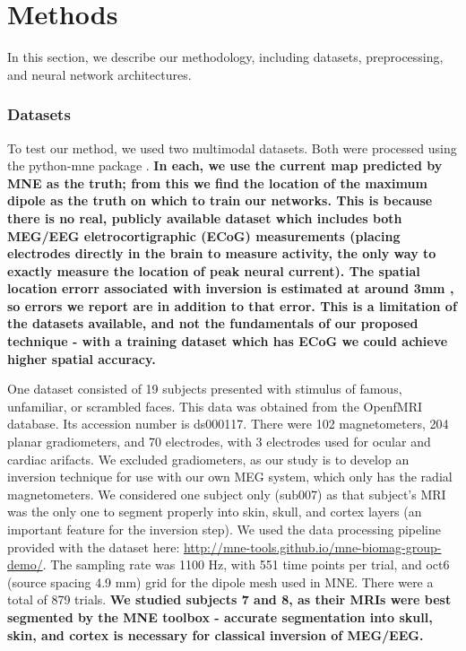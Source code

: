 \documentclass[journal,12pt,onecolumn,draftclsnofoot,]{IEEEtran}
\begin{document}
\section{Methods}

In this section, we describe our methodology, including datasets, preprocessing, and neural network architectures.

\subsubsection{Datasets}

To test our method, we used two multimodal datasets. Both were processed using the python-mne package \cite{gramfort2014mne}. \textbf{In each, we use the current map predicted by MNE as the truth; from this we find the location of the maximum dipole as the truth on which to train our networks. This is because there is no real, publicly available dataset which includes both MEG/EEG eletrocortigraphic (ECoG) measurements (placing electrodes directly in the brain to measure activity, the only way to exactly measure the location of peak neural current). The spatial location errorr associated with inversion is estimated at around 3mm \cite{leahy1998study}, so errors we report are in addition to that error. This is a limitation of the datasets available, and not the fundamentals of our proposed technique - with a training dataset which has ECoG we could achieve higher spatial accuracy.}

One dataset \cite{wakeman2015multi} consisted of 19 subjects presented with stimulus of famous, unfamiliar, or scrambled faces. This data was obtained from the OpenfMRI database. Its accession number is ds000117. There were 102 magnetometers, 204 planar gradiometers, and 70 electrodes, with 3 electrodes used for ocular and cardiac arifacts. We excluded gradiometers, as our study is to develop an inversion technique for use with our own MEG system, which only has the radial magnetometers. We considered one subject only (sub007) as that subject's MRI was the only one to segment properly into skin, skull, and cortex layers (an important feature for the inversion step). We used the data processing pipeline provided with the dataset here: \url{http://mne-tools.github.io/mne-biomag-group-demo/}. The sampling rate was 1100 Hz, with 551 time points per trial, and oct6 (source spacing 4.9 mm) grid for the dipole mesh used in MNE. There were a total of 879 trials. \textbf{We studied subjects 7 and 8, as their MRIs were best segmented by the MNE toolbox - accurate segmentation into skull, skin, and cortex is necessary for classical inversion of MEG/EEG.}
\end{document}
